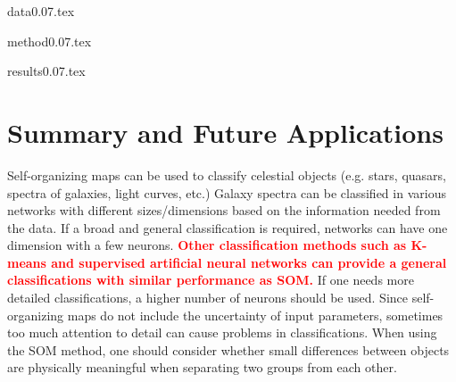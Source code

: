 \documentclass[useAMS,usenatbib]{mn2e}
\begin{document}
{data0.07.tex}


{method0.07.tex}

{results0.07.tex}
\section{Summary and Future Applications}
\label{sec: summary_SOMZ}

Self-organizing maps can be used to classify celestial objects (e.g. stars, quasars, spectra of galaxies, light curves, etc.)
Galaxy spectra can be classified in various networks with different sizes/dimensions based on the information needed from the data. 
If a broad and general classification is required, networks can have one dimension with a few neurons. 
\textbf{\textcolor{red}{Other classification methods such as K-means and supervised artificial neural networks can provide a general classifications with similar performance as SOM.}}
If one needs more detailed classifications, a higher number of neurons should be used.
Since self-organizing maps do not include the uncertainty of input parameters, sometimes too much attention to detail can cause problems in classifications. 
When using the SOM method, one should consider whether small differences between objects are physically meaningful when separating two groups from each other.
\end{document}
